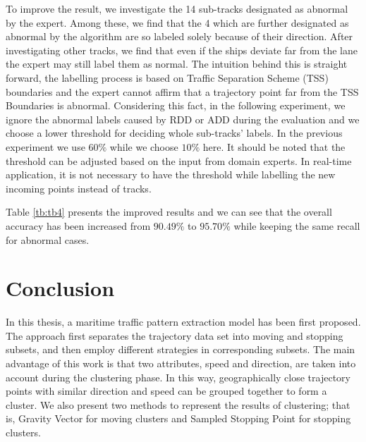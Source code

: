 \documentclass[12pt,glossary]{dalcsthesis}
\begin{document}
To improve the result, we investigate the 14 sub-tracks designated as abnormal by the expert. Among these, we find that the 4 which are further designated as abnormal by the algorithm are so labeled solely because of their direction. After investigating other tracks, we find that
even if the ships deviate far from the lane the expert may still label them as normal. The intuition behind this is straight forward, the labelling process is based on Traffic Separation Scheme (TSS) \cite{tss} boundaries and the expert cannot affirm that a trajectory point far from the TSS Boundaries is abnormal. %
Considering this fact, in the following experiment, we ignore the abnormal labels caused by RDD or ADD during the evaluation and we choose a lower threshold for deciding  whole sub-tracks' labels. In the previous experiment we use $60\%$ while we choose $10\%$ here. It should be noted that the threshold can be adjusted based on the input from domain experts. In real-time application, it is not necessary to have the threshold while labelling the new incoming points instead of tracks.

Table \ref{tb:tb4} presents the improved results and we can see that the overall accuracy has been increased from $90.49\%$ to $95.70\%$ while keeping the same recall for abnormal cases.




\chapter{Conclusion}
\label{ch:conclusion}


In this thesis, a maritime traffic pattern extraction model has been first proposed. The approach first separates the trajectory data set into moving and stopping subsets, and then employ different strategies in corresponding subsets. The main advantage of this work is that two attributes, speed and direction, are taken into account during the clustering phase. In this way, geographically close trajectory points with similar direction and speed can be grouped together to form a cluster. We also present two methods to represent the results of clustering; that is, Gravity Vector for moving clusters and Sampled Stopping Point for stopping clusters.  %
\end{document}

